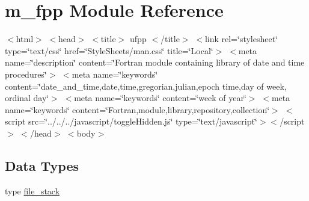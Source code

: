 \hypertarget{namespacem__fpp}{}\section{m\+\_\+fpp Module Reference}
\label{namespacem__fpp}


$<$html$>$ $<$head$>$ $<$title$>$ ufpp $<$/title$>$ $<$link rel=\char`\"{}stylesheet\char`\"{} type=\char`\"{}text/css\char`\"{} href=\char`\"{}\+Style\+Sheets/man.\+css\char`\"{} title=\char`\"{}\+Local\char`\"{}$>$ $<$meta name=\char`\"{}description\char`\"{} content=\char`\"{}\+Fortran module containing library of date and time procedures\char`\"{}$>$ $<$meta name=\char`\"{}keywords\char`\"{} content=\char`\"{}date\+\_\+and\+\_\+time,date,time,gregorian,julian,epoch time,day of week, ordinal day\char`\"{}$>$ $<$meta name=\char`\"{}keywords\char`\"{} content=\char`\"{}week of year\char`\"{}$>$ $<$meta name=\char`\"{}keywords\char`\"{} content=\char`\"{}\+Fortran,module,library,repository,collection\char`\"{}$>$ $<$script src=\char`\"{}../../../javascript/toggle\+Hidden.\+js\char`\"{} type=\char`\"{}text/javascript\char`\"{}$>$$<$/script$>$ $<$/head$>$ $<$body$>$

\href{../../../GPF.html}{\tt } 


\subsection*{Data Types}
\begin{DoxyCompactItemize}
\item 
type \hyperlink{structm__fpp_1_1file__stack}{file\+\_\+stack}
\end{DoxyCompactItemize}
